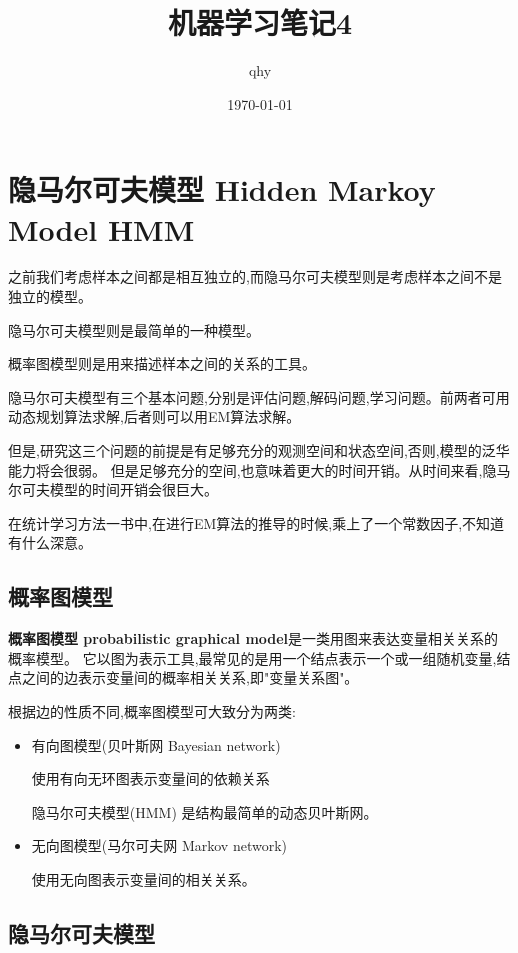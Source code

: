 \documentclass[UTF8,a4paper]{ctexart}%
\author{qhy}%
\title{机器学习笔记4}%
\date{\today}%
\begin{document}
  \maketitle
  \tableofcontents
  \newpage
    \section{隐马尔可夫模型 Hidden Markoy Model HMM}
        {\color{blue}
          之前我们考虑样本之间都是相互独立的,而隐马尔可夫模型则是考虑样本之间不是独立的模型。

          隐马尔可夫模型则是最简单的一种模型。

          概率图模型则是用来描述样本之间的关系的工具。

          隐马尔可夫模型有三个基本问题,分别是评估问题,解码问题,学习问题。前两者可用动态规划算法求解,后者则可以用EM算法求解。

          但是,研究这三个问题的前提是有足够充分的观测空间和状态空间,否则,模型的泛华能力将会很弱。
          但是足够充分的空间,也意味着更大的时间开销。从时间来看,隐马尔可夫模型的时间开销会很巨大。

          在统计学习方法一书中,在进行EM算法的推导的时候,乘上了一个常数因子,不知道有什么深意。
        }
        \subsection{概率图模型}
            \textbf{概率图模型 probabilistic graphical model}是一类用图来表达变量相关关系的概率模型。
            它以图为表示工具,最常见的是用一个结点表示一个或一组随机变量,结点之间的边表示变量间的概率相关关系,即"变量关系图"。

            根据边的性质不同,概率图模型可大致分为两类:
            \begin{itemize}
              \item 有向图模型(贝叶斯网 Bayesian network)

                  使用有向无环图表示变量间的依赖关系

                  {\color{blue}
                      隐马尔可夫模型(HMM) 是结构最简单的动态贝叶斯网。
                  }

              \item 无向图模型(马尔可夫网 Markov network)

                  使用无向图表示变量间的相关关系。

            \end{itemize}
        \subsection{隐马尔可夫模型}
\end{document}
